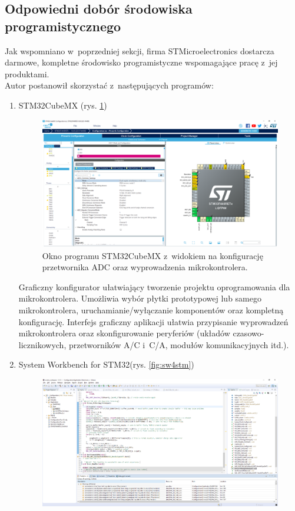 \subsection{Odpowiedni dobór środowiska programistycznego}
\label{sec:IDE}
Jak wspomniano w~poprzedniej sekcji, firma STMicroelectronics dostarcza darmowe, kompletne środowisko programistyczne wspomagające pracę z~jej produktami.\\
Autor postanowił skorzystać z~następujących programów:
\begin{enumerate}
	\item STM32CubeMX (rys. \ref{fig:cubemx})\\
	\begin{figure}[h!]
		\centering
		\includegraphics[scale=0.3]{../Assets/stm32CubeMX.png}
		\caption{Okno programu STM32CubeMX z~widokiem na konfigurację przetwornika ADC oraz wyprowadzenia mikrokontrolera.}
		\label{fig:cubemx}
	\end{figure}
	Graficzny konfigurator ułatwiający tworzenie projektu oprogramowania dla mikrokontrolera. Umożliwia wybór płytki prototypowej lub samego mikrokontrolera, uruchamianie/wyłączanie komponentów oraz kompletną konfigurację. Interfejs graficzny aplikacji ułatwia przypisanie wyprowadzeń mikrokontrolera oraz skonfigurowanie peryferiów (układów czasowo-licznikowych, przetworników A/C i~C/A, modułów komunikacyjnych itd.).
	\item System Workbench for STM32(rys. \ref{fig:sw4stm})\\
	\begin{figure}[h!]
		\centering
		\includegraphics[scale=0.3]{../Assets/sw4stm32.png}

\end{figure}
\end{enumerate}

